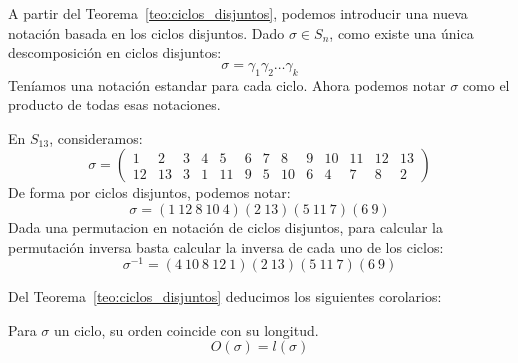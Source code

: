 \begin{notacion}
    A partir del Teorema~\ref{teo:ciclos_disjuntos}, podemos introducir una nueva notación basada en los ciclos disjuntos. Dado $\sigma\in S_n$, como existe una única descomposición en ciclos disjuntos:
    \begin{equation*}
        \sigma=\gamma_1\gamma_2\ldots\gamma_k
    \end{equation*}
    Teníamos una notación estandar para cada ciclo. Ahora podemos notar $\sigma$ como el producto de todas esas notaciones.
\end{notacion}

\begin{ejemplo}
    En $S_{13}$, consideramos:
    \begin{equation*}
        \sigma = \left(\begin{array}{ccccccccccccc}
                1 & 2 & 3 & 4 & 5 & 6 & 7 & 8 & 9 & 10 & 11 & 12 & 13 \\
                12 & 13 & 3 & 1 & 11 & 9 & 5 & 10 & 6 & 4 & 7 & 8 & 2
        \end{array}\right)
    \end{equation*}
    De forma por ciclos disjuntos, podemos notar:
    \begin{equation*}
        \sigma = (1\ 12\ 8\ 10\ 4)(2\ 13)(5\ 11\ 7)(6\ 9)
    \end{equation*}
    Dada una permutacion en notación de ciclos disjuntos, para calcular la permutación inversa basta calcular la inversa de cada uno de los ciclos:
    \begin{equation*}
        \sigma^{-1} = (4\ 10\ 8\ 12\ 1)(2\ 13)(5\ 11\ 7)(6\ 9)
    \end{equation*}
\end{ejemplo}

Del Teorema~\ref{teo:ciclos_disjuntos} deducimos los siguientes corolarios:
\begin{coro}\label{cor:orden_long_ciclos}
    Para $\sigma$ un ciclo, su orden coincide con su longitud.
    \begin{equation*}
        O(\sigma) = l(\sigma)
    \end{equation*}
\end{coro}

